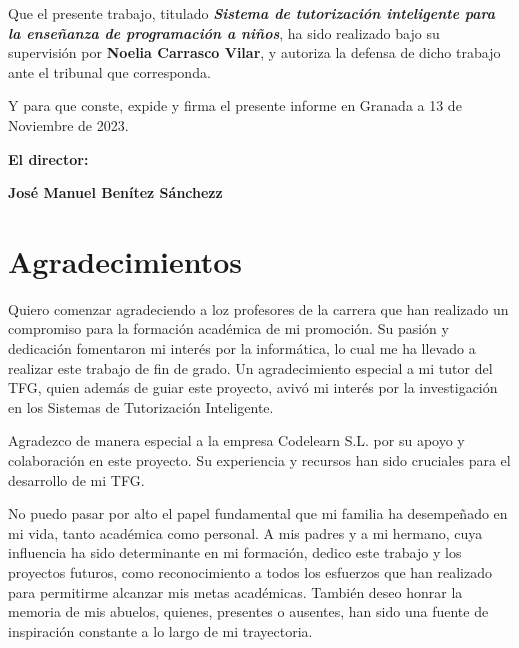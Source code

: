 \vspace{0.5cm}

Que el presente trabajo, titulado \textit{\textbf{ Sistema de tutorización inteligente para la enseñanza de programación a niños}}, ha sido realizado bajo su supervisión por \textbf{Noelia Carrasco Vilar}, y autoriza la defensa de dicho trabajo ante el tribunal que corresponda.

\vspace{0.5cm}

Y para que conste, expide y firma el presente informe en Granada a 13 de
Noviembre de 2023.

\vspace{1cm}

\textbf{El director:}

\vspace{5cm}

\noindent \textbf{José Manuel Benítez Sánchezz}

\chapter*{Agradecimientos}

Quiero comenzar agradeciendo a loz profesores de la carrera que han realizado un compromiso para la formación académica de mi promoción. Su pasión y dedicación fomentaron mi interés por la informática, lo cual me ha llevado a realizar este trabajo de fin de grado. Un agradecimiento especial a mi tutor del TFG, quien además de guiar este proyecto, avivó mi interés por la investigación en los Sistemas de Tutorización Inteligente.

Agradezco de manera especial a la empresa Codelearn S.L. por su apoyo y colaboración en este proyecto. Su experiencia y recursos han sido cruciales para el desarrollo de mi TFG.

No puedo pasar por alto el papel fundamental que mi familia ha desempeñado en mi vida, tanto académica como personal. A mis padres y a mi hermano, cuya influencia ha sido determinante en mi formación, dedico este trabajo y los proyectos futuros, como reconocimiento a todos los esfuerzos que han realizado para permitirme alcanzar mis metas académicas.  También deseo honrar la memoria de mis abuelos, quienes, presentes o ausentes, han sido una fuente de inspiración constante a lo largo de mi trayectoria.


